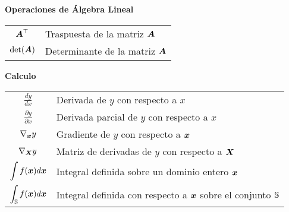 \vspace{\notationgap}
\begin{minipage}{\textwidth}
\centerline{\bf Operaciones de Álgebra Lineal}
\bgroup
\def\arraystretch{1.5}
\begin{tabular}{cp{3.25in}}
$\displaystyle {\bm{A}}^\top$ & Traspuesta de la matriz ${\bm{A}}$ \\
$\displaystyle \mathrm{det}({\bm{A}})$ & Determinante de la matriz ${\bm{A}}$ \\
\end{tabular}
\egroup
{}
\end{minipage}

\vspace{\notationgap}
\begin{minipage}{\textwidth}
\centerline{\bf Calculo}
\bgroup
\def\arraystretch{1.5}
\begin{tabular}{cp{3.25in}}
$\displaystyle\frac{d y} {d x}$ & Derivada de $y$ con respecto a  $x$\\ [2ex]
$\displaystyle \frac{\partial y} {\partial x} $ & Derivada parcial de $y$ con respecto a $x$ \\
$\displaystyle \nabla_{\bm{x}} y $ & Gradiente de $y$ con respecto a ${\bm{x}}$ \\
$\displaystyle \nabla_{\bm{X}} y $ & Matriz de derivadas de $y$ con respecto a ${\bm{X}}$ \\
$\displaystyle \int f({\bm{x}}) d{\bm{x}} $ & Integral definida sobre un dominio entero ${\bm{x}}$ \\
$\displaystyle \int_{\mathbb{S}} f({\bm{x}}) d{\bm{x}}$ & Integral definida con respecto a ${\bm{x}}$ sobre el conjunto ${\mathbb{S}}$ \\
\end{tabular}
\egroup
{}
\end{minipage}

